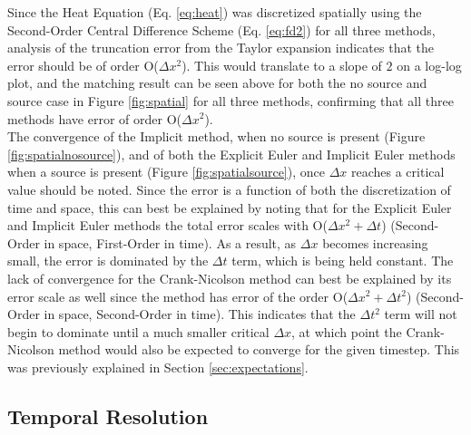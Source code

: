 \documentclass[10pt, letter, showtrims]{extarticle}
\begin{document}
		\noindent
		Since the Heat Equation (Eq. \ref{eq:heat}) was discretized spatially using the Second-Order Central Difference Scheme (Eq. \ref{eq:fd2}) for all three methods, analysis of the truncation error from the Taylor expansion indicates that the error should be of order O($\Delta x^{2}$). This would translate to a slope of $2$ on a log-log plot, and the matching result can be seen above for both the no source and source case in Figure \ref{fig:spatial} for all three methods, confirming that all three methods have error of order O($\Delta x^{2}$). \\
		
		\noindent
		The convergence of the Implicit method, when no source is present (Figure \ref{fig:spatialnosource}), and of both the Explicit Euler and Implicit Euler methods when a source is present (Figure \ref{fig:spatialsource}), once $\Delta x$ reaches a critical value should be noted. Since the error is a function of both the discretization of time and space, this can best be explained by noting that for the Explicit Euler and Implicit Euler methods the total error scales with O($\Delta x^{2} + \Delta t$) (Second-Order in space, First-Order in time). As a result, as $\Delta x$ becomes increasing small, the error is dominated by the $\Delta t$ term, which is being held constant. The lack of convergence for the Crank-Nicolson method can best be explained by its error scale as well since the method has error of the order O($\Delta x^{2} + \Delta t^{2}$) (Second-Order in space, Second-Order in time). This indicates that the $\Delta t^{2}$ term will not begin to dominate until a much smaller critical $\Delta x$, at which point the Crank-Nicolson method would also be expected to converge for the given timestep. This was previously explained in Section \ref{sec:expectations}.
		
		\pagebreak
		
		\subsection{Temporal Resolution}
		\label{sec:temporal}
		
\end{document}
